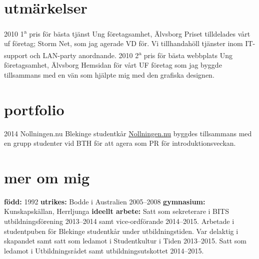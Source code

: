 \documentclass[]{friggeri-cv} %
\begin{document}
\section{utmärkelser}

\begin{entrylist}
\entry
{2010}
{1\textsuperscript{a} pris för bästa tjänst}
{Ung företagsamhet, Älvsborg}
{Priset tilldelades vårt uf företag; Storm Net, som jag agerade VD för. Vi tillhandahöll tjänster inom IT-support och LAN-party anordnande.}
\entry
{2010}
{2\textsuperscript{a} pris för bästa webbplats}
{Ung företagsamhet, Älvsborg}
{Hemsidan för vårt UF företag som jag byggde tillsammans med en vän som hjälpte mig med den grafiska designen.}
\end{entrylist}


\section{portfolio}

\begin{entrylist}
\entry
{2014}
{Nollningen.nu}
{Blekinge studentkår}
{\href{http://www.nollningen.nu}{Nollningen.nu} byggdes tillsammans med en grupp studenter vid BTH för att agera som PR för introduktionsveckan.}
\end{entrylist}


\section{mer om mig}
\textbf{född:} 1992 \textbf{utrikes:} Bodde i Australien 2005--2008 \textbf{gymnasium:} Kunskapskällan, Herrljunga \textbf{ideellt arbete:} Satt som sekreterare i BITS utbildningsförening 2013--2014 samt vice-ordförande 2014--2015. Arbetade i studentpuben för Blekinge studentkår under utbildningstiden. Var delaktig i skapandet samt satt som ledamot i Studentkultur i Tiden 2013--2015. Satt som ledamot i Utbildningsrådet samt utbildningsutskottet 2014--2015.
\end{document}
